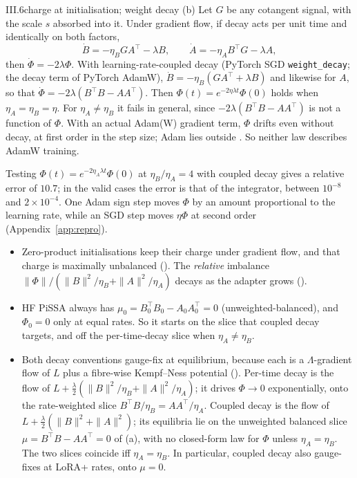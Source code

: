 \begin{corollary}{III.6}{charge at initialisation; weight decay}
(b) Let $G$ be any cotangent signal, with the scale $s$ absorbed into it. Under gradient flow, if decay acts per unit time and identically on both factors,
\[\dot B=-\eta_BGA^\top-\lambda B,\qquad\dot A=-\eta_AB^\top G-\lambda A,\]
then $\dot\Phi=-2\lambda\Phi$. With learning-rate-coupled decay (PyTorch SGD \texttt{weight\_decay}; the decay term of PyTorch AdamW), $\dot B=-\eta_B(GA^\top+\lambda B)$ and likewise for $A$, so that $\dot\Phi=-2\lambda(B^\top B-AA^\top)$. Then $\Phi(t)=e^{-2\eta\lambda t}\Phi(0)$ holds when $\eta_A=\eta_B=\eta$. For $\eta_A\ne\eta_B$ it fails in general, since $-2\lambda(B^\top B-AA^\top)$ is not a function of $\Phi$. With an actual Adam(W) gradient term, $\Phi$ drifts even without decay, at first order in the step size; Adam lies outside . So neither law describes AdamW training.
\end{corollary}

\noindent{}\enspace Testing $\Phi(t)=e^{-2\eta_A\lambda t}\Phi(0)$ at $\eta_B/\eta_A=4$ with coupled decay gives a relative error of $10.7$; in the valid cases the error is that of the integrator, between $10^{-8}$ and $2\times10^{-4}$. One Adam sign step moves $\Phi$ by an amount proportional to the learning rate, while an SGD step moves $\eta\Phi$ at second order (Appendix~\ref{app:repro}).

\begin{explains}
\begin{itemize}
\item Zero-product initialisations keep their charge under gradient flow, and that charge is maximally unbalanced (). The \emph{relative} imbalance $\|\Phi\|/(\|B\|^2/\eta_B+\|A\|^2/\eta_A)$ decays as the adapter grows ().
\item HF PiSSA always has $\mu_0=B_0^\top B_0-A_0A_0^\top=0$ (unweighted-balanced), and $\Phi_0=0$ only at equal rates. So it starts on the slice that coupled decay targets, and off the per-time-decay slice when $\eta_A\ne\eta_B$.
\item Both decay conventions gauge-fix at equilibrium, because each is a $\Lambda$-gradient flow of $L$ plus a fibre-wise Kempf--Ness potential (). Per-time decay is the flow of $L+\tfrac\lambda2(\|B\|^2/\eta_B+\|A\|^2/\eta_A)$; it drives $\Phi\to0$ exponentially, onto the rate-weighted slice $B^\top B/\eta_B=AA^\top/\eta_A$. Coupled decay is the flow of $L+\tfrac\lambda2(\|B\|^2+\|A\|^2)$; its equilibria lie on the unweighted balanced slice $\mu=B^\top B-AA^\top=0$ of (a), with no closed-form law for $\Phi$ unless $\eta_A=\eta_B$. The two slices coincide iff $\eta_A=\eta_B$. In particular, coupled decay also gauge-fixes at LoRA+ rates, onto $\mu=0$.
\end{itemize}
\end{explains}

